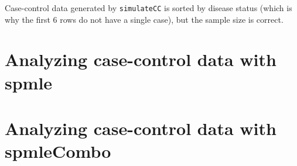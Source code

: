 \documentclass{article}\usepackage[]{graphicx}\usepackage[]{color}
\def\code#1{\texttt{#1}}
\begin{document}
Case-control data generated by \code{simulateCC} is sorted by disease status (which is why the first 6 rows do not have a single case), but the sample size is correct.


\section{Analyzing case-control data with spmle} \label{sec:spmle}



\section{Analyzing case-control data with spmleCombo} \label{sec:spmleCombo}











\end{document}
